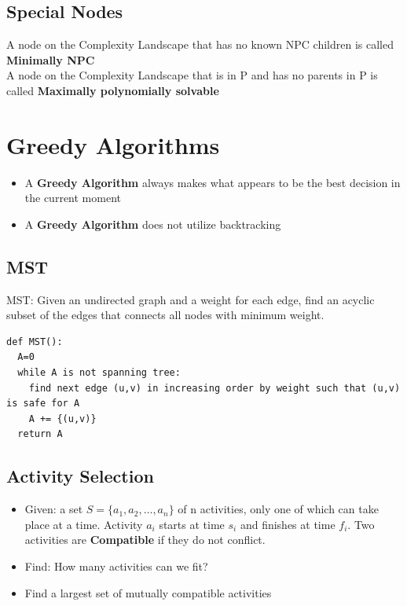 \documentclass[12pt, letter]{article}
\begin{document}
\subsection*{Special Nodes}
A node on the Complexity Landscape that has no known NPC children is called \textbf{Minimally NPC}  \\
A node on the Complexity Landscape that is in P and has no parents in P is called \textbf{Maximally polynomially solvable} 

\section{Greedy Algorithms}%
\label{sec:greedy_algorithms}
\begin{itemize}
	\item A \textbf{Greedy Algorithm} always makes what appears to be the best decision in the current moment
	\item A \textbf{Greedy Algorithm} does not utilize backtracking
\end{itemize}

\subsection*{MST}
MST: Given an undirected graph and a weight for each edge, find an acyclic subset of the edges that connects all nodes with minimum weight.

\begin{verbatim}
def MST():
  A=0
  while A is not spanning tree:
    find next edge (u,v) in increasing order by weight such that (u,v) is safe for A
    A += {(u,v)}
  return A
\end{verbatim}

\subsection*{Activity Selection}
\begin{itemize}
	\item Given: a set $S=\{a_1, a_2, \ldots, a_n\}$ of n activities, only one of which can take place at a time. Activity $a_i$ starts at time  $s_i$ and finishes at time $f_i$. Two activities are \textbf{Compatible} if they do not conflict.
	\item Find: How many activities can we fit?
	\item Find a largest set of mutually compatible activities
\end{itemize}
\end{document}
